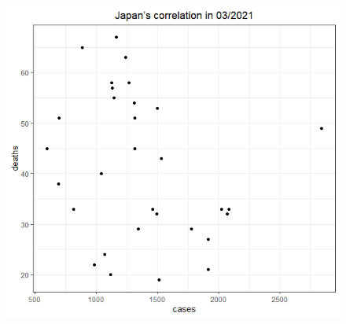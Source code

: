 \documentclass[english,10pt,table]{beamer}
\begin{document}
{\begin{figure}[H]
\begin{center}
        \includegraphics[scale = 0.2]{ix/ix.2/JPN_03_2021.png}
    \end{center}
    \end{figure}
}
\end{document}
